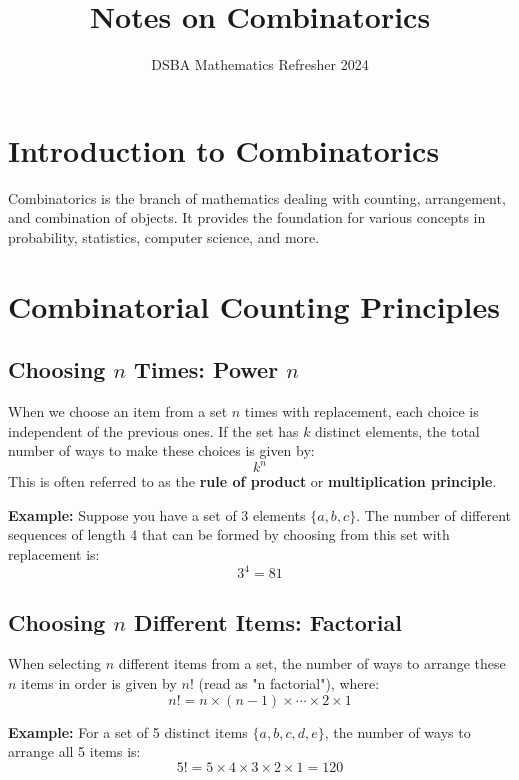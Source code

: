 \documentclass[]{article}
\title{Notes on Combinatorics}
\author{DSBA Mathematics Refresher 2024}
\date{}
\begin{document}
	
	\maketitle
	
	\begin{abstract}
		
	\end{abstract}
	
	
	\section{Introduction to Combinatorics}
	Combinatorics is the branch of mathematics dealing with counting, arrangement, and combination of objects. It provides the foundation for various concepts in probability, statistics, computer science, and more.
	
	\section{Combinatorial Counting Principles}
	
	\subsection{Choosing $n$ Times: Power $n$}
	When we choose an item from a set $n$ times with replacement, each choice is independent of the previous ones. If the set has $k$ distinct elements, the total number of ways to make these choices is given by:
	\[
	k^n
	\]
	This is often referred to as the \textbf{rule of product} or \textbf{multiplication principle}.
	
	\textbf{Example:} 
	Suppose you have a set of 3 elements $\{a, b, c\}$. The number of different sequences of length 4 that can be formed by choosing from this set with replacement is:
	\[
	3^4 = 81
	\]
	
	\subsection{Choosing $n$ Different Items: Factorial}
	When selecting $n$ different items from a set, the number of ways to arrange these $n$ items in order is given by $n!$ (read as "n factorial"), where:
	\[
	n! = n \times (n-1) \times \cdots \times 2 \times 1
	\]
	
	\textbf{Example:} 
	For a set of 5 distinct items $\{a, b, c, d, e\}$, the number of ways to arrange all 5 items is:
	\[
	5! = 5 \times 4 \times 3 \times 2 \times 1 = 120
	\]
	
\end{document}
